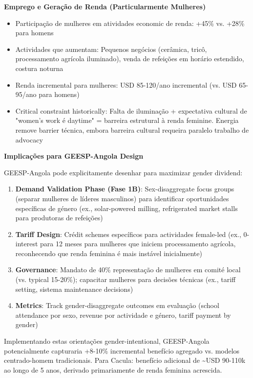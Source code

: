 \documentclass[12pt, a4paper]{article}
\begin{document}
\textbf{Emprego e Geração de Renda (Particularmente Mulheres)}
\begin{itemize}
\item Participação de mulheres em atividades economic de renda: +45\% vs. +28\% para homens
\item Actividades que aumentam: Pequenos negócios (cerâmica, tricô, processamento agrícola iluminado), venda de refeições em horário estendido, costura noturna
\item Renda incremental para mulheres: USD 85-120/ano incremental (vs. USD 65-95/ano para homens)
\item Critical constraint historically: Falta de iluminação + expectativa cultural de "women's work é daytime" = barreira estrutural à renda feminine. Energia remove barrier técnica, embora barreira cultural requeira paralelo trabalho de advocacy
\end{itemize}

\textbf{Implicações para GEESP-Angola Design}

GEESP-Angola pode explicitamente desenhar para maximizar gender dividend:
\begin{enumerate}
\item \textbf{Demand Validation Phase (Fase 1B)}: Sex-disaggregate focus groups (separar mulheres de líderes masculinos) para identificar oportunidades específicas de género (ex., solar-powered milling, refrigerated market stalls para produtoras de refeições)
\item \textbf{Tariff Design}: Crédit schemes específicos para actividades female-led (ex., 0-interest para 12 meses para mulheres que iniciem processamento agrícola, reconhecendo que renda feminina é mais instável inicialmente)
\item \textbf{Governance}: Mandato de 40\% representação de mulheres em comité local (vs. typical 15-20\%); capacitar mulheres para decisões técnicas (ex., tariff setting, sistema maintenance decisions)
\item \textbf{Metrics}: Track gender-disaggregate outcomes em evaluação (school attendance por sexo, revenue por actividade e género, tariff payment by gender)
\end{enumerate}

Implementando estas orientações gender-intentional, GEESP-Angola potencialmente capturaria +8-10\% incremental benefício agregado vs. modelos centrado-homem tradicionais. Para Cacula: benefício adicional de \textasciitilde{}USD 90-110k ao longo de 5 anos, derivado primariamente de renda feminina acrescida.
\end{document}
